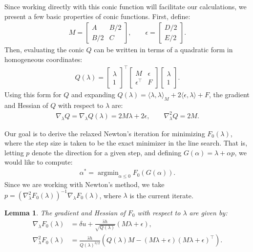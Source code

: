 \documentclass{article}
\newcommand{\parens}[1]{\left(#1\right)}
\newtheorem{lemma}{Lemma}
\DeclareMathOperator{\argmin}{argmin}
\begin{document}
Since working directly with this conic function will facilitate our
calculations, we present a few basic properties of conic
functions. First, define:
\begin{align*}
  M = \begin{bmatrix} A & B/2 \\ B/2 & C \end{bmatrix}, \qquad \epsilon = \begin{bmatrix} D/2 \\ E/2 \end{bmatrix}.
\end{align*}
Then, evaluating the conic $Q$ can be written in terms of a quadratic
form in homogeneous coordinates:
\begin{align*}
  Q(\lambda) = \begin{bmatrix} \lambda \\ 1 \end{bmatrix}^\top \begin{bmatrix}
    M & \epsilon \\ \epsilon^\top & F \end{bmatrix} \begin{bmatrix} \lambda \\ 1 \end{bmatrix}.
\end{align*}
Using this form for $Q$ and expanding
$Q(\lambda) = \langle \lambda, \lambda \rangle_M + 2 \langle \epsilon,
\lambda \rangle + F$, the gradient and Hessian of $Q$ with respect to
$\lambda$ are:
\begin{align*}
  \nabla_\lambda Q = \nabla_\lambda Q(\lambda) = 2M\lambda + 2\epsilon, \qquad \nabla_\lambda^2 Q = 2M.
\end{align*}

Our goal is to derive the relaxed Newton's iteration for minimizing
$F_0(\lambda)$, where the step size is taken to be the exact minimizer
in the line search. That is, letting $p$ denote the direction for a
given step, and defining $G(\alpha) = \lambda + \alpha p$, we would
like to compute:
\begin{align*}
  \alpha^* = \argmin_{\alpha \leq 0} F_0(G(\alpha)).
\end{align*}
Since we are working with Newton's method, we take
$p = {(\nabla_\lambda^2F_0(\lambda))}^{-1} \nabla_\lambda F_0(\lambda)$,
where $\lambda$ is the current iterate.

\begin{lemma}
  The gradient and Hessian of $F_0$ with respect to $\lambda$ are given
  by:
  \begin{align*}
    \nabla_\lambda F_0(\lambda) &= \delta u + \frac{\hat{s} h}{\sqrt{Q(\lambda)}} {(M\lambda + \epsilon)}, \\
    \nabla_\lambda^2 F_0(\lambda) &= \frac{\hat{s}h}{Q(\lambda)^{3/2}} \parens{Q(\lambda) M - {(M\lambda + \epsilon)}{(M\lambda + \epsilon)}^\top}.
  \end{align*}
\end{lemma}
\end{document}
